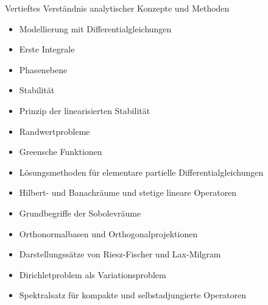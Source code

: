 \begin{module}
\begin{learningoutcomes}
Vertieftes Verständnis analytischer Konzepte und Methoden


\end{learningoutcomes}

\begin{content}
\begin{itemize}\item Modellierung mit Differentialgleichungen  \item Erste Integrale  \item Phasenebene  \item Stabilität  \item Prinzip der linearisierten Stabilität  \item Randwertprobleme  \item Greensche Funktionen  \item Lösungsmethoden für elementare partielle Differentialgleichungen  \item Hilbert- und Banachräume und stetige lineare Operatoren  \item Grundbegriffe der Sobolevräume  \item Orthonormalbasen und Orthogonalprojektionen  \item Darstellungssätze von Riesz-Fischer und Lax-Milgram  \item Dirichletproblem als Variationsproblem  \item Spektralsatz für kompakte und selbstadjungierte Operatoren  \end{itemize}
\end{content}



\end{module}

